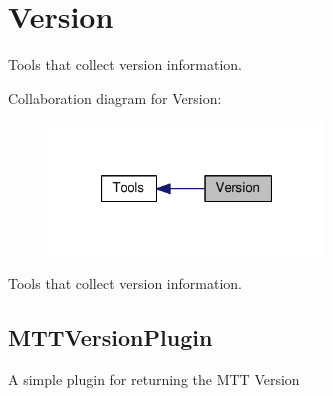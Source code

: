 \hypertarget{group__Version}{\section{Version}
\label{group__Version}
}


Tools that collect version information.  


Collaboration diagram for Version\-:
\nopagebreak
\begin{figure}[H]
\begin{center}
\leavevmode
\includegraphics[width=208pt]{group__Version}
\end{center}
\end{figure}
Tools that collect version information. \hypertarget{group__Version_MTTVersionPlugin}{}\subsection{M\-T\-T\-Version\-Plugin}\label{group__Version_MTTVersionPlugin}
A simple plugin for returning the M\-T\-T Version 